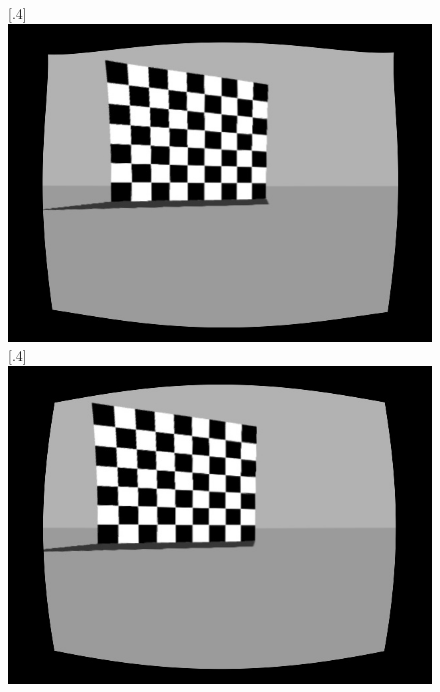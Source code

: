 \begin{figure}[h]
	\centering
	\subcaptionbox{}%
	[.4\linewidth]{\includegraphics[scale=.2]{chapters/03_background/img/gazebo_rectified_left.jpg}}
	\subcaptionbox{}%
	[.4\linewidth]{\includegraphics[scale=.2]{chapters/03_background/img/gazebo_rectified_right.jpg}}
	\caption{}
	\label{fig::323_rectified}
\end{figure}
